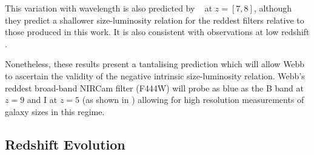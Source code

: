This variation with wavelength is also predicted by \bluetides\ \citep{Marshall21} at $z=[7,8]$, although they predict a shallower size-luminosity relation for the reddest filters relative to those produced in this work. It is also consistent with observations at low redshift \citep[e.g.][]{Barbera10, Kelvin12, Vulcani14, Kennedy15, Tacchella_2015}. 

Nonetheless, these results present a tantalising prediction which will allow Webb to ascertain the validity of the negative intrinsic size-luminosity relation. Webb's reddest broad-band NIRCam filter (F444W) will probe as blue as the B band at $z=9$ and I at $z=5$ (as shown in ) allowing for high resolution measurements of galaxy sizes in this regime.

\subsection{Redshift Evolution}

